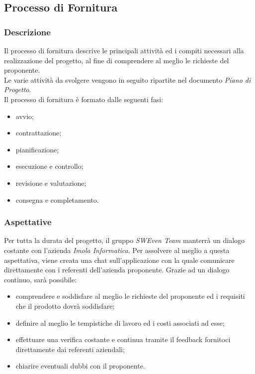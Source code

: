 
\subsection{Processo di Fornitura}
	
	\subsubsection{Descrizione}
  Il processo di fornitura descrive le principali attività ed i compiti necessari alla realizzazione del 
  progetto, al fine di comprendere al meglio le richieste del proponente.\\	
  Le varie attività da svolgere vengono in seguito ripartite nel documento \textit{Piano di Progetto}. \\
  Il processo di fornitura è formato dalle seguenti fasi: 
  \begin{itemize}
		\item avvio;
		\item contrattazione;
		\item pianificazione;
		\item esecuzione e controllo;
		\item revisione e valutazione;
		\item consegna e completamento.
	\end{itemize}
	
  \subsubsection{Aspettative}
  Per tutta la durata del progetto, il gruppo \textit{SWEven Team} manterrà un dialogo costante con l'azienda \textit{Imola Informatica}. 
  Per assolvere al meglio a questa aspettativa, viene creata una chat sull'applicazione  con la quale comunicare direttamente con i referenti dell'azienda proponente. 
  Grazie ad un dialogo continuo, sarà possibile:
  \begin{itemize}
    \item comprendere e soddisfare al meglio le richieste del proponente ed i requisiti che il prodotto dovrà soddisfare;
    \item definire al meglio le tempistiche di lavoro ed i costi associati ad esse;
    \item effettuare una verifica costante e continua tramite il feedback fornitoci direttamente dai referenti aziendali;
    \item chiarire eventuali dubbi con il proponente.
  \end{itemize}
  
